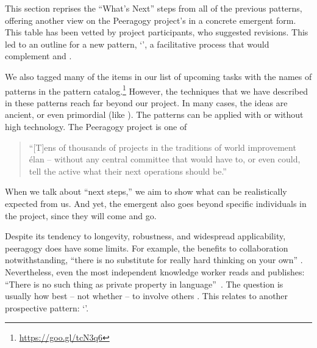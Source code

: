 \begin{refsection}

This section reprises the ``What's Next'' steps from all of the
previous patterns, offering another view on the Peeragogy project's
 in a concrete emergent form.
%
This table has been vetted by project participants, who suggested
revisions.  This led to an outline for a new pattern,
`', a facilitative process that would
complement  and .

We also tagged many of the items in our list of upcoming tasks with the names of
patterns in the pattern catalog.\footnote{\url{https://goo.gl/tcN3q6}}
However, the techniques that we have described in these patterns reach
far beyond our project.  In many cases, the ideas are ancient, or even
primordial (like ).  The patterns can be
applied with or without high technology.  The Peeragogy project is one
of
\begin{quote}
 ``[T]ens of thousands of projects in the traditions of world
improvement \'elan -- without any central committee that would have
to, or even could, tell the active what their next operations should
be.'' \cite[p. 402]{sloterdijk2013change}
\end{quote}
When we talk about ``next steps,'' we aim to show what can be
realistically expected from us.
And yet, the emergent  also goes beyond specific
individuals in the project, since they will come and go.

Despite its tendency to longevity, robustness, and
widespread applicability, peeragogy does have some limits. For example,
the benefits to collaboration
notwithstanding, 
``there is no substitute for really hard
thinking on your own'' \cite{atiyah1974research}.
Nevertheless, even the most independent knowledge worker reads and
publishes: ``There is no such thing as private property in
language''~\cite[p.~559]{jakobson1971selected}.  The question is
usually how best -- not whether -- to involve others
\cite{coase1937nature,coases-penguin}.  This relates to another
prospective pattern: `'.


\end{refsection}

